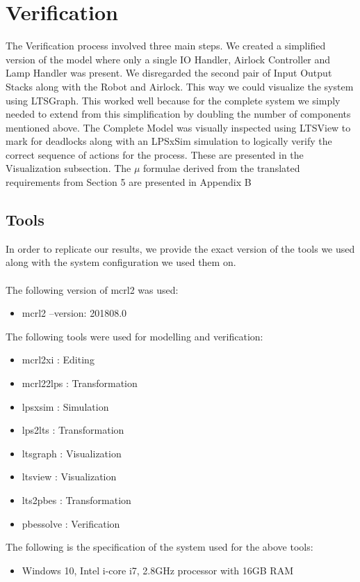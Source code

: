 \documentclass[a4paper,12pt]{article}
\begin{document}
\section{Verification}
The Verification process involved three main steps. We created a simplified version of the model where only a single IO Handler, Airlock Controller and Lamp Handler was present. We disregarded the second pair of Input Output Stacks along with the Robot and Airlock. This way we could visualize the system using LTSGraph. This worked well because for the complete system we simply needed to extend from this simplification by doubling the number of components mentioned above. The Complete Model was visually inspected using LTSView to mark for deadlocks along with an LPSxSim simulation to logically verify the correct sequence of actions for the process. These are presented in the Visualization subsection. The $\mu$ formulae derived from the translated requirements from Section 5 are presented in Appendix B 
\subsection{Tools}
In order to replicate our results, we provide the exact version of the tools we used along with the system configuration we used them on.
\\
\\The following version of mcrl2 was used:
\begin{itemize}
    \item mcrl2 --version: 201808.0
\end{itemize}
The following tools were used for modelling and verification:
\begin{itemize}
    \item mcrl2xi : Editing
    \item mcrl22lps : Transformation
    \item lpsxsim : Simulation
    \item lps2lts : Transformation
    \item ltsgraph : Visualization
    \item ltsview : Visualization
    \item lts2pbes : Transformation
    \item pbessolve : Verification
\end{itemize}
The following is the specification of the system used for the above tools:
\begin{itemize}
    \item Windows 10, Intel i-core i7, 2.8GHz processor with 16GB RAM 
\end{itemize}
\end{document}
